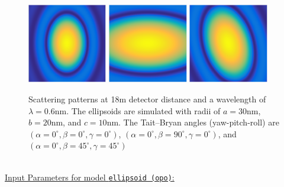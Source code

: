 \begin{figure}[htb]
\includegraphics[width=0.31\textwidth]{../images/form_factor/supershapes/ellipsoid_0_0_0_18m.png} \hfill
\includegraphics[width=0.31\textwidth]{../images/form_factor/supershapes/ellipsoid_0_90_0_18m.png}  \hfill \includegraphics[width=0.31\textwidth]{../images/form_factor/supershapes/ellipsoid_0_45_45_18m.png}
\caption{Scattering patterns at 18m detector distance and a wavelength of $\lambda=0.6$nm. The ellipsoids are simulated with radii of $a=30$nm, $b=20$nm, and $c=10$nm. The Tait–Bryan angles (yaw-pitch-roll) are $(\alpha=0^\circ,\beta=0^\circ,\gamma=0^\circ)$, $(\alpha=0^\circ,\beta=90^\circ,\gamma=0^\circ)$, and $(\alpha=0^\circ,\beta=45^\circ,\gamma=45^\circ)$ }
\label{fig:opo_ellipsoidIQ2D}
\end{figure}
~\\
\uline{Input Parameters for model \texttt{ellipsoid (opo)}:}
